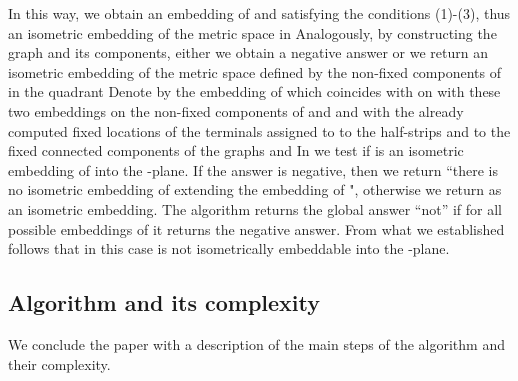 \documentclass[11pt]{amsart}
\begin{document}
In this way, we obtain an embedding of  and
 satisfying the conditions (1)-(3), thus an
isometric embedding of the metric space 
in  Analogously, by constructing the graph  and
its components, either we obtain a negative answer or we return an
isometric embedding  of the metric space defined by the non-fixed
components of  in the quadrant  Denote by  the
embedding of  which coincides with  on  with these
two embeddings on the non-fixed components of  and  and
with the already computed fixed locations of the terminals assigned
to  to the half-strips  and to the fixed
connected components of the graphs  and  In  we
test if  is an isometric embedding of  into the
-plane. If the answer is negative, then we return ``there is no
isometric embedding of  extending the embedding 
of ", otherwise we return  as an isometric embedding.
The algorithm returns the global answer ``not'' if for all possible
embeddings   of  it returns the negative answer.
From what we established follows that in this case  is not
isometrically embeddable into the -plane.


\subsection{Algorithm and its complexity}

We conclude the paper with a description of the main steps of the algorithm and their complexity.
\end{document}
